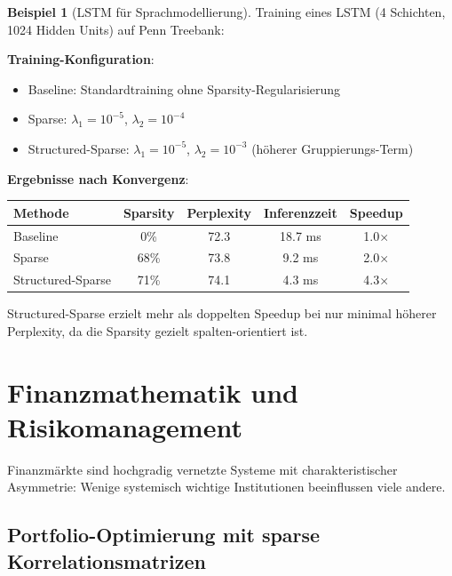 ﻿\documentclass[a4paper,12pt]{report}
\theoremstyle{definition}
\newtheorem{beispiel}{Beispiel}
\begin{document}
	\begin{beispiel}[LSTM für Sprachmodellierung]
		Training eines LSTM (4 Schichten, 1024 Hidden Units) auf Penn Treebank:
		
		\textbf{Training-Konfiguration}:
		\begin{itemize}
			\item Baseline: Standardtraining ohne Sparsity-Regularisierung
			\item Sparse: $\lambda_1 = 10^{-5}$, $\lambda_2 = 10^{-4}$
			\item Structured-Sparse: $\lambda_1 = 10^{-5}$, $\lambda_2 = 10^{-3}$ (höherer Gruppierungs-Term)
		\end{itemize}
		
		\textbf{Ergebnisse nach Konvergenz}:
		\begin{center}
			\begin{tabular}{|l|c|c|c|c|}
				\hline
				\textbf{Methode} & \textbf{Sparsity} & \textbf{Perplexity} & \textbf{Inferenzzeit} & \textbf{Speedup} \\
				\hline
				Baseline & 0\% & 72.3 & 18.7 ms & 1.0$\times$ \\
				Sparse & 68\% & 73.8 & 9.2 ms & 2.0$\times$ \\
				Structured-Sparse & 71\% & 74.1 & 4.3 ms & 4.3$\times$ \\
				\hline
			\end{tabular}
		\end{center}
		
		Structured-Sparse erzielt mehr als doppelten Speedup bei nur minimal höherer Perplexity, da die Sparsity gezielt spalten-orientiert ist.
	\end{beispiel}
	
	\section{Finanzmathematik und Risikomanagement}
	
	Finanzmärkte sind hochgradig vernetzte Systeme mit charakteristischer Asymmetrie: Wenige systemisch wichtige Institutionen beeinflussen viele andere.
	
	\subsection{Portfolio-Optimierung mit sparse Korrelationsmatrizen}
	
\end{document}
